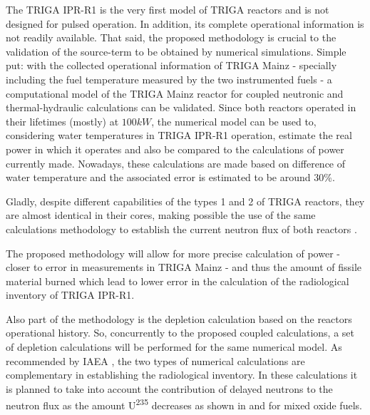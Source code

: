 \documentclass[11pt]{article} %
\begin{document}
The TRIGA IPR-R1 is the very first model of TRIGA reactors and is not designed for pulsed operation. In addition, its complete operational information is not readily available. That said, the proposed methodology is crucial to the validation of the source-term to be obtained by numerical simulations. Simple put: with the collected operational information of TRIGA Mainz - specially including the fuel temperature measured by the two instrumented fuels - a computational model of the TRIGA Mainz reactor for coupled neutronic and thermal-hydraulic calculations can be validated. Since both reactors operated in their lifetimes (mostly) at $100 kW$, the numerical model can be used to, considering water temperatures in TRIGA IPR-R1 operation, estimate the real power in which it operates and also be compared to the calculations of power currently made. Nowadays, these calculations are made based on difference of water temperature and the associated error is estimated to be around 30\%.

Gladly, despite different capabilities of the types 1 and 2 of TRIGA reactors, they are almost identical in their cores, making possible the use of the same calculations methodology to establish the current neutron flux of both reactors \cite{who}.

The proposed methodology will allow for more precise calculation of power - closer to error in measurements in TRIGA Mainz - and thus the amount of fissile material burned which lead to lower error in the calculation of the radiological inventory of TRIGA IPR-R1.

Also part of the methodology \cite[figura IAEA]{who} is the depletion calculation based on the reactors operational history. So, concurrently to the proposed coupled calculations, a set of depletion calculations will be performed for the same numerical model. As recommended by IAEA \cite{descomissionamento}, the two types of numerical calculations are complementary in establishing the radiological inventory. In these calculations it is planned to take into account the contribution of delayed neutrons to the neutron flux as the amount U\textsuperscript{235} decreases as shown in \cite{Carvalho_2024} and \cite{Carvalho_2025} for mixed oxide fuels.

\end{document}
